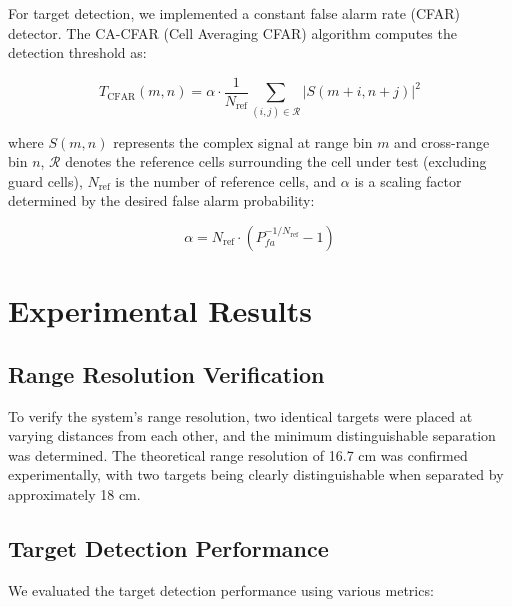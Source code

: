 \documentclass[11pt,a4paper]{article}
\begin{document}
For target detection, we implemented a constant false alarm rate (CFAR) detector. The CA-CFAR (Cell Averaging CFAR) algorithm computes the detection threshold as:

\begin{equation}
T_{\text{CFAR}}(m, n) = \alpha \cdot \frac{1}{N_{\text{ref}}} \sum_{(i,j) \in \mathcal{R}} |S(m+i, n+j)|^2
\end{equation}

where $S(m,n)$ represents the complex signal at range bin $m$ and cross-range bin $n$, $\mathcal{R}$ denotes the reference cells surrounding the cell under test (excluding guard cells), $N_{\text{ref}}$ is the number of reference cells, and $\alpha$ is a scaling factor determined by the desired false alarm probability:

\begin{equation}
\alpha = N_{\text{ref}} \cdot (P_{fa}^{-1/N_{\text{ref}}} - 1)
\end{equation}

\section{Experimental Results}

\subsection{Range Resolution Verification}

To verify the system's range resolution, two identical targets were placed at varying distances from each other, and the minimum distinguishable separation was determined. The theoretical range resolution of 16.7 cm was confirmed experimentally, with two targets being clearly distinguishable when separated by approximately 18 cm.

\subsection{Target Detection Performance}

We evaluated the target detection performance using various metrics:
\end{document}
